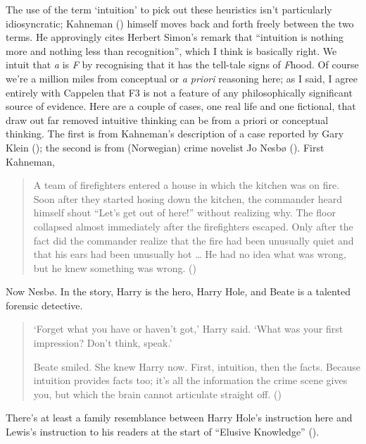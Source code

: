 \documentclass[
  11pt,
  letterpaper,
  DIV=11,
  numbers=noendperiod,
  twoside]{scrartcl}
\begin{document}
The use of the term `intuition' to pick out these heuristics isn't
particularly idiosyncratic; Kahneman ()
himself moves back and forth freely between the two terms. He
approvingly cites Herbert Simon's remark that ``intuition is nothing
more and nothing less than recognition'', which I think is basically
right. We intuit that \emph{a} is \emph{F} by recognising that it has
the tell-tale signs of \emph{F}hood. Of course we're a million miles
from conceptual or \emph{a priori} reasoning here; as I said, I agree
entirely with Cappelen that F3 is not a feature of any philosophically
significant source of evidence. Here are a couple of cases, one real
life and one fictional, that draw out far removed intuitive thinking can
be from a priori or conceptual thinking. The first is from Kahneman's
description of a case reported by Gary Klein
(); the second is from (Norwegian) crime
novelist Jo Nesbø (). First Kahneman,

\begin{quote}
A team of firefighters entered a house in which the kitchen was on fire.
Soon after they started hosing down the kitchen, the commander heard
himself shout ``Let's get out of here!'' without realizing why. The
floor collapsed almost immediately after the firefighters escaped. Only
after the fact did the commander realize that the fire had been
unusually quiet and that his ears had been unusually hot \ldots{} He had
no idea what was wrong, but he knew something was wrong.
()
\end{quote}

Now Nesbø. In the story, Harry is the hero, Harry Hole, and Beate is a
talented forensic detective.

\begin{quote}
`Forget what you have or haven't got,' Harry said. `What was your first
impression? Don't think, speak.'

Beate smiled. She knew Harry now. First, intuition, then the facts.
Because intuition provides facts too; it's all the information the crime
scene gives you, but which the brain cannot articulate straight off.
()
\end{quote}

There's at least a family resemblance between Harry Hole's instruction
here and Lewis's instruction to his readers at the start of ``Elusive
Knowledge'' ().
\end{document}
